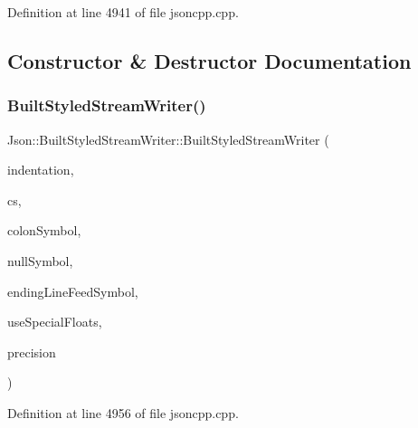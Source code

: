 Definition at line 4941 of file jsoncpp.\+cpp.



\subsection{Constructor \& Destructor Documentation}
\mbox{\label{struct_json_1_1_built_styled_stream_writer_adf11b7d1ee3c68d096b7c662ee85948e}} 
\subsubsection{\texorpdfstring{Built\+Styled\+Stream\+Writer()}{BuiltStyledStreamWriter()}}
{\footnotesize\ttfamily Json\+::\+Built\+Styled\+Stream\+Writer\+::\+Built\+Styled\+Stream\+Writer (\begin{DoxyParamCaption}\item[{\hyperlink{json_8h_a1e723f95759de062585bc4a8fd3fa4be}{J\+S\+O\+N\+C\+P\+P\+\_\+\+S\+T\+R\+I\+NG} const \&}]{indentation,  }\item[{\hyperlink{struct_json_1_1_comment_style_a51fc08f3518fd81eba12f340d19a3d0c}{Comment\+Style\+::\+Enum}}]{cs,  }\item[{\hyperlink{json_8h_a1e723f95759de062585bc4a8fd3fa4be}{J\+S\+O\+N\+C\+P\+P\+\_\+\+S\+T\+R\+I\+NG} const \&}]{colon\+Symbol,  }\item[{\hyperlink{json_8h_a1e723f95759de062585bc4a8fd3fa4be}{J\+S\+O\+N\+C\+P\+P\+\_\+\+S\+T\+R\+I\+NG} const \&}]{null\+Symbol,  }\item[{\hyperlink{json_8h_a1e723f95759de062585bc4a8fd3fa4be}{J\+S\+O\+N\+C\+P\+P\+\_\+\+S\+T\+R\+I\+NG} const \&}]{ending\+Line\+Feed\+Symbol,  }\item[{bool}]{use\+Special\+Floats,  }\item[{unsigned int}]{precision }\end{DoxyParamCaption})}



Definition at line 4956 of file jsoncpp.\+cpp.


